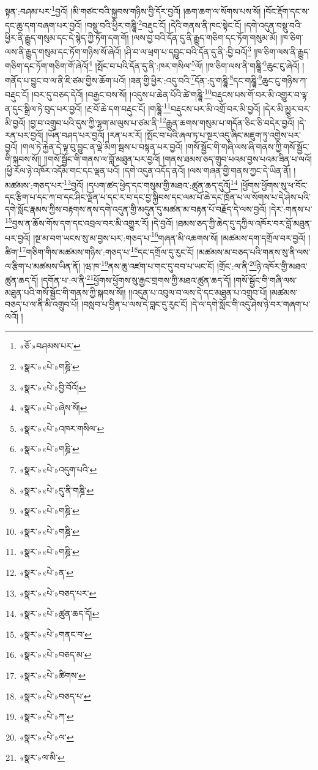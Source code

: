 སྟན་:བཤམ་པར་\footnote{«ཅོ་»བཤམས་པར་}བྱའོ། །མི་གཙང་བའི་སྐྱབས་གཉིས་བྱི་དོར་བྱའོ། །ཆག་ཆག་ལ་སོགས་པས་སོ། །བོང་རྡོག་དང་ས་དང་ཆུ་དག་བཞག་པར་བྱའོ། །བསྡུ་བའི་ཕྱིར་གཎྜཱི་\footnote{«སྣར་»«པེ་»གཎྜི་}བརྡུང་ངོ། །དེའི་གནས་ནི་ཁང་སྟེང་ངོ། །དགེ་འདུན་བསྡུ་བའི་ཕྱིར་ནི་རྒྱུད་གསུམ་དང་དེ་སྙེད་ཀྱི་ཏོག་དག་གོ། །ལས་བྱ་བའི་དོན་དུ་ནི་རྒྱུད་གཅིག་དང་ཏོག་གསུམ་མོ། །ཁ་ཅིག་ལས་ནི་རྒྱུད་གསུམ་དང་ཏོག་གཉིས་སོ་ཞེའོ། །ཤི་བ་ལ་ཕྲག་པ་དབྱུང་བའི་དོན་དུ་ནི་:བྱི་བའོ།\footnote{«སྣར་»«པེ་»བྱི་བོའོ།} །ཁ་ཅིག་ལས་ནི་རྒྱུད་གཅིག་དང་ཏོག་གཅིག་གོ་ཞེའོ།\footnote{«སྣར་»«པེ་»ཞེས་སོ།} །སྤོང་བ་པའི་དོན་དུ་ནི་:ཁར་གསིལ་\footnote{«སྣར་»«པེ་»འཁར་གསིལ་}ལོ། །ཁ་ཅིག་ལས་ནི་གཎྜཱི་\footnote{«སྣར་»«པེ་»གཎྜི་}ཆུང་ངུ་ཞེའོ། །གནོད་པ་བྱུང་བ་ལ་ནི་ཇི་ཙམ་གྱིས་ཆོག་པའོ། །ཟན་གྱི་ཕྱིར་:འདུ་བའི་\footnote{«སྣར་»«པེ་»འདུག་པའི་}དོན་:དུ་གཎྜཱི་\footnote{«སྣར་»«པེ་»དུ་ནི་གཎྜི་}དང་གཎྜཱི་\footnote{«སྣར་»«པེ་»གཎྜི་}ཆུང་ངུ་གཉིས་ཀ་བརྡུང་ངོ། །བར་དུ་བཅད་དེའོ། །བརྒྱང་བས་སོ། །འདུས་པ་ཆེན་པོའི་ཚེ་གཎྜཱི་\footnote{«སྣར་»«པེ་»གཎྜི་}བརྡུངས་པས་གོ་བར་མི་འགྱུར་བ་ལྟ་ན་དུང་སྒྲིལ་ཏེ་བུད་པར་བྱའོ། །རྔ་བོ་ཆེ་དག་བརྡུང་ངོ། །གཎྜཱི་\footnote{«སྣར་»«པེ་»གཎྜི་}བརྡུངས་པར་མི་འགྲོ་བར་མི་བྱའོ། །དེར་མི་མྱུར་བར་མི་བྱའོ། །བྱ་བ་འགྲུབ་པའི་དུས་ཀྱི་ལྷག་མ་ལུས་པ་ཙམ་ནི་\footnote{«སྣར་»«པེ་»ན་}རྒྱུན་ཆགས་གསུམ་པ་གདོན་ཅིང་ཅི་བདེར་བྱའོ། །དེ་རན་པར་བྱའོ། །ཡོན་བཤད་པར་བྱའོ། །རན་པར་རོ། །སྤོང་བ་པའི་ཞལ་ཏ་པ་སྔར་འདུ་ཞིང་མཇུག་ཏུ་འགྱེས་པར་བྱའོ། །གལ་ཏེ་རྐྱེན་དེ་ལྟ་བུ་བྱུང་ན་ལྡེ་མིག་སྦས་པ་བསྟན་པར་བྱའོ། །གསོ་སྦྱོང་གི་གཞི་ལས་ཞི་གནས་ཀྱི་གསོ་སྦྱོང་གི་སྐབས་སོ།། །།གསོ་སྦྱོང་གི་གནས་ལ་བློ་མཐུན་པར་བྱའོ། །གནས་ཐམས་ཅད་གྲུབ་པའམ་བྱས་པའམ་ཟིན་པ་ལའོ། །ཕྱི་རོལ་ཉེ་འཁོར་འདོམ་གང་དང་ལྡན་པའོ། །དགེ་འདུན་འདོད་ནའོ། །ལས་གཞན་གྱི་གནས་ཀྱང་དེ་ཡིན་ནོ། །མཚམས་:གཅད་པར་\footnote{«སྣར་»«པེ་»བཅད་པར་}བྱའོ། །དཔག་ཚད་ཕྱེད་དང་གསུམ་གྱི་མཐའ་:ཚུན་ཆད་དུའོ།\footnote{«སྣར་»«པེ་»ཚུན་ཆད་དོ།} །ཕྱོགས་ཕྱོགས་སུ་ཕ་བོང་དང་རྩིག་པ་དང་ཀ་བ་དང་ཤིང་ལྗོན་པ་དང་ར་བ་དང་བྱ་སྐྱིབས་དང་ལམ་པོ་ཆེ་དང་ཁྲོན་པ་ལ་སོགས་པ་དེ་ཤེས་པའི་དགེ་སློང་རྣམས་ཀྱིས་བརྟགས་ནས་དགེ་འདུན་གྱི་མདུན་དུ་མཚན་མ་བརྟན་པོ་བརྗོད་དེ་ལས་བྱའོ། །དེར་:གནས་པ་\footnote{«སྣར་»«པེ་»གནང་བ་}བྱས་ན་ཆོས་གོས་དག་དང་འབྲལ་བར་མི་འགྱུར་རོ། །དེ་བྱའོ། །ཐམས་ཅད་ཀྱི་ཆེད་དུ་དཀྱིལ་འཁོར་བར་བློ་མཐུན་པར་བྱའོ། །སྔ་མ་བག་ཡངས་སུ་མ་བྱས་པར་:གཅད་པ་\footnote{«སྣར་»«པེ་»བཅད་མ་}གཞན་མི་འཆགས་སོ། །མཚམས་དག་དགྲོལ་བར་བྱའོ། །ཚིག་\footnote{«སྣར་»«པེ་»ཚིགས་}གཅིག་གིས་མཚམས་གཉིས་:གཅད་པ་\footnote{«སྣར་»«པེ་»བཅད་པ་}དང་དགྲོལ་དུ་རུང་ངོ། །མཚམས་མ་བཅད་པའི་གནས་སུ་ནི་ལས་ལ་རྩིག་པ་མཚམས་ཡིན་ནོ། །ཝ་ཁ་\footnote{«སྣར་»«པེ་»ཀ་}ནས་ཆུ་འཛག་པ་གང་དུ་བབ་པ་ཡང་ངོ། །གྲོང་:ལ་ནི་\footnote{«སྣར་»«པེ་»ལ་}ཉེ་འཁོར་གྱི་མཐའ་ཚུན་ཆད་དོ། །དགོན་པ་:ལ་ནི་\footnote{«སྣར་»ལ་མི་}ཕྱོགས་ཕྱོགས་སུ་རྒྱང་གྲགས་ཀྱི་མཐའ་ཚུན་ཆད་དོ། །གསོ་སྦྱོང་གི་གཞི་ལས་མཐུན་པའི་གསོ་སྦྱོང་གི་གནས་ཀྱི་སྐབས་སོ།། །།འདུན་པ་འབུལ་བ་ལས་དེ་དང་མཐུན་པ་འགྲུབ་པོ། །མཚམས་བཅད་པ་ལ་ནི་མི་འགྲུབ་པོ། །བསླབ་པ་བྱིན་པ་ལས་དེ་བླང་དུ་རུང་ངོ། །དེ་ལ་དགེ་སློང་གི་འདུ་ཤེས་ཉེ་བར་གཞག་པ་ལའོ། །
